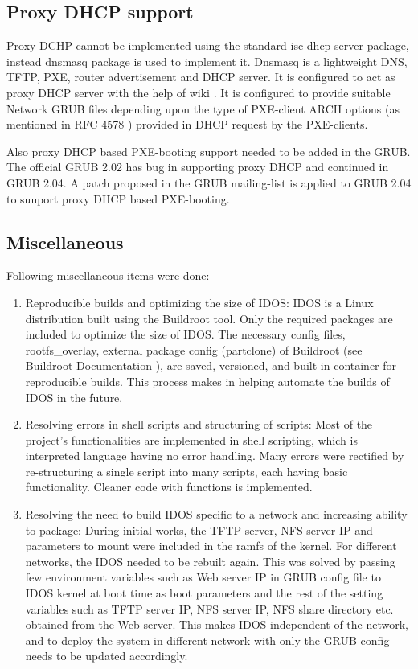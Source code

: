 \documentclass[a4paper,12pt]{article}
\begin{document}
\subsection{Proxy DHCP support}
Proxy DCHP cannot be implemented using the standard isc-dhcp-server package, instead dnsmasq \cite{dnsmasq} package is used to implement it. Dnsmasq is a lightweight DNS, TFTP, PXE, router advertisement and DHCP server. It is configured to act as proxy DHCP server with the help of wiki \cite{dnsmasq_config}. It is configured to provide suitable Network GRUB files depending upon the type of PXE-client ARCH options (as mentioned in RFC 4578 \cite{4578}) provided in DHCP request by the PXE-clients.

Also proxy DHCP based PXE-booting support needed to be added in the GRUB. The official GRUB 2.02  has bug in supporting proxy DHCP \cite{bug} and continued in GRUB 2.04. A patch proposed in the GRUB mailing-list \cite{patch} is applied to GRUB 2.04 to suuport proxy DHCP based PXE-booting.






\subsection{ Miscellaneous}
Following miscellaneous items were done:
\begin{enumerate}
    \item Reproducible builds and optimizing the size of IDOS: IDOS is a Linux distribution built using the Buildroot tool. Only the required packages are included to optimize the size of IDOS. The necessary config files, rootfs\_overlay, external package config (partclone) of Buildroot (see Buildroot Documentation \cite{buildrootdoc}), are saved, versioned, and built-in container for reproducible builds. This process makes in helping automate the builds of IDOS in the future.
    \item Resolving errors in shell scripts and structuring of scripts: Most of the project's functionalities are implemented in shell scripting, which is interpreted language having no error handling. Many errors were rectified by re-structuring a single script into many scripts, each having basic functionality. Cleaner code with functions is implemented.
    \item Resolving the need to build IDOS specific to a network and increasing ability to package: During initial works, the TFTP server, NFS server IP and parameters to mount were included in the ramfs of the kernel. For different networks, the IDOS needed to be rebuilt again. This was solved by passing few environment variables such as Web server IP in GRUB config file to IDOS kernel at boot time as boot parameters and the rest of the setting variables such as TFTP server IP, NFS server IP, NFS share directory etc. obtained from the Web server. This makes IDOS independent of the network, and to deploy the system in different network with only the GRUB config needs to be updated accordingly.
\end{enumerate}
 \newpage
\end{document}
